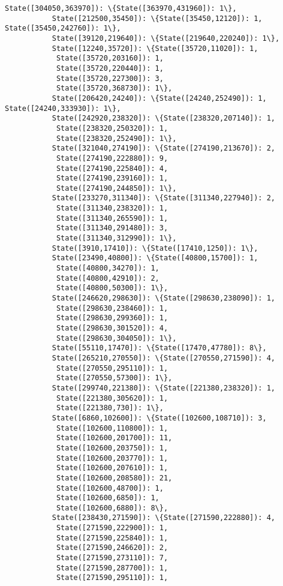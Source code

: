 \documentclass[11pt]{article}
\begin{document}
\begin{Verbatim}[commandchars=\\\{\}]
           State([304050,363970]): \{State([363970,431960]): 1\},
           State([212500,35450]): \{State([35450,12120]): 1, State([35450,242760]): 1\},
           State([39120,219640]): \{State([219640,220240]): 1\},
           State([12240,35720]): \{State([35720,11020]): 1,
            State([35720,203160]): 1,
            State([35720,220440]): 1,
            State([35720,227300]): 3,
            State([35720,368730]): 1\},
           State([206420,24240]): \{State([24240,252490]): 1, State([24240,333930]): 1\},
           State([242920,238320]): \{State([238320,207140]): 1,
            State([238320,250320]): 1,
            State([238320,252490]): 1\},
           State([321040,274190]): \{State([274190,213670]): 2,
            State([274190,222880]): 9,
            State([274190,225840]): 4,
            State([274190,239160]): 1,
            State([274190,244850]): 1\},
           State([233270,311340]): \{State([311340,227940]): 2,
            State([311340,238320]): 1,
            State([311340,265590]): 1,
            State([311340,291480]): 3,
            State([311340,312990]): 1\},
           State([3910,17410]): \{State([17410,1250]): 1\},
           State([23490,40800]): \{State([40800,15700]): 1,
            State([40800,34270]): 1,
            State([40800,42910]): 2,
            State([40800,50300]): 1\},
           State([246620,298630]): \{State([298630,238090]): 1,
            State([298630,238460]): 1,
            State([298630,299360]): 1,
            State([298630,301520]): 4,
            State([298630,304050]): 1\},
           State([55110,17470]): \{State([17470,47780]): 8\},
           State([265210,270550]): \{State([270550,271590]): 4,
            State([270550,295110]): 1,
            State([270550,57300]): 1\},
           State([299740,221380]): \{State([221380,238320]): 1,
            State([221380,305620]): 1,
            State([221380,730]): 1\},
           State([6860,102600]): \{State([102600,108710]): 3,
            State([102600,110800]): 1,
            State([102600,201700]): 11,
            State([102600,203750]): 1,
            State([102600,203770]): 1,
            State([102600,207610]): 1,
            State([102600,208580]): 21,
            State([102600,48700]): 1,
            State([102600,6850]): 1,
            State([102600,6880]): 8\},
           State([238430,271590]): \{State([271590,222880]): 4,
            State([271590,222900]): 1,
            State([271590,225840]): 1,
            State([271590,246620]): 2,
            State([271590,273110]): 7,
            State([271590,287700]): 1,
            State([271590,295110]): 1,

\end{Verbatim}
\end{document}
